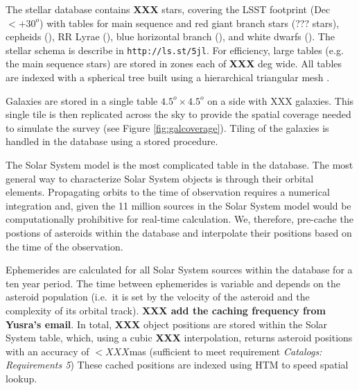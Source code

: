 \documentclass[]{article}
\begin{document}
{The stellar database contains {\bf XXX} stars, covering the LSST
footprint (Dec $< +30^o$) with tables for main sequence and red giant
branch stars (??? stars), cepheids (), RR Lyrae (), blue horizontal
branch (), and white dwarfs ().  The stellar schema is describe in
{\tt http://ls.st/5jl}. For efficiency, large tables (e.g. the main
sequence stars) are stored in zones each of {\bf XXX} deg wide.  All
tables are indexed with a spherical tree built using a hierarchical
triangular mesh \citep[HTM][]{htm}.

Galaxies are stored in a single table $4.5^o \times 4.5^o$ on a side
with XXX galaxies. This single tile is then replicated across the sky
to provide the spatial coverage needed to simulate the survey (see
Figure \ref{fig:galcoverage}).  Tiling of the galaxies is handled in
the database using a stored procedure. %

The Solar System model is the most complicated table in the
database. The most general way to characterize Solar System objects is
through their orbital elements.  Propagating orbits to the time of
observation requires a numerical integration and, given the 11 million
sources in the Solar System model would be computationally prohibitive
for real-time calculation. We, therefore, pre-cache the postions of
asteroids within the database and interpolate their positions based on
the time of the observation.

Ephemerides are calculated for all Solar System sources within the
database for a ten year period. The time between ephemerides is
variable and depends on the asteroid population (i.e.\ it is set by
the velocity of the asteroid and the complexity of its orbital track).
{\bf XXX add the caching frequency from Yusra's email}. In total, {\bf
  XXX} object positions are stored within the Solar System table,
which, using a cubic {\bf XXX} interpolation, returns asteroid
positions with an accuracy of $<XXX$mas (sufficient to meet
requirement {\it Catalogs: Requirements 5}) These cached positions are
indexed using HTM \citep{XXX} to speed spatial lookup.


}
\end{document}
